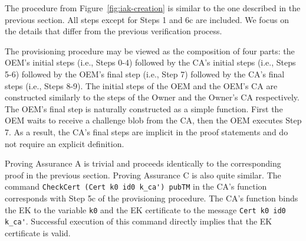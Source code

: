 \documentclass[runningheads]{llncs}
\begin{document}
The procedure from Figure~\ref{fig:iak-creation} is similar to the one
described in the previous section. All steps except for Steps 1 and 6c
are included. We focus on the details that differ from the previous
verification process.




The provisioning procedure may be viewed as the composition of four
parts: the OEM's initial steps (i.e., Steps 0-4) followed by the CA's
initial steps (i.e., Steps 5-6) followed by the OEM's final step
(i.e., Step 7) followed by the CA's final steps (i.e., Steps 8-9). The
initial steps of the OEM and the OEM's CA are constructed similarly to
the steps of the Owner and the Owner's CA respectively.  The OEM's
final step is naturally constructed as a simple function. First the
OEM waits to receive a challenge blob from the CA, then the OEM
executes Step 7. As a result, the CA's final steps are implicit in the
proof statements and do not require an explicit definition.

Proving Assurance A is trivial and proceeds identically to the
corresponding proof in the previous section. Proving Assurance C is
also quite similar. The command
\verb|CheckCert (Cert k0 id0 k_ca') pubTM| in the CA's function
corresponds with Step 5c of the provisioning procedure. The CA's
function binds the EK to the variable \verb|k0| and the EK certificate
to the message \verb|Cert k0 id0 k_ca'|.  Successful execution of this
command directly implies that the EK certificate is valid.
\end{document}
